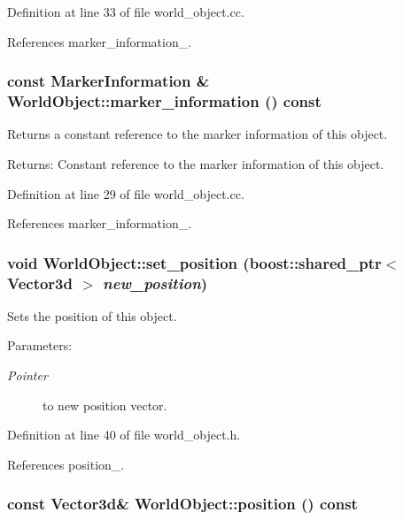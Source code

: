 Definition at line 33 of file world\_\-object.cc.

References marker\_\-information\_\-.\hypertarget{class_world_object_1dd7d80498c6b502ad9870c54cbf4305}{
\subsubsection[marker\_\-information]{\setlength{\rightskip}{0pt plus 5cm}const {\bf MarkerInformation} \& WorldObject::marker\_\-information () const}}
\label{class_world_object_1dd7d80498c6b502ad9870c54cbf4305}


Returns a constant reference to the marker information of this object. \begin{Desc}
\item[Returns:]Constant reference to the marker information of this object. \end{Desc}


Definition at line 29 of file world\_\-object.cc.

References marker\_\-information\_\-.\hypertarget{class_world_object_60afe09f64b069c79833bb9a07a71cc1}{
\subsubsection[set\_\-position]{\setlength{\rightskip}{0pt plus 5cm}void WorldObject::set\_\-position (boost::shared\_\-ptr$<$ Vector3d $>$ {\em new\_\-position})}}
\label{class_world_object_60afe09f64b069c79833bb9a07a71cc1}


Sets the position of this object. \begin{Desc}
\item[Parameters:]
\begin{description}
\item[{\em Pointer}]to new position vector. \end{description}
\end{Desc}


Definition at line 40 of file world\_\-object.h.

References position\_\-.\hypertarget{class_world_object_27b52dcd1b64d4dd45936da833e1ea26}{
\subsubsection[position]{\setlength{\rightskip}{0pt plus 5cm}const Vector3d\& WorldObject::position () const}}
\label{class_world_object_27b52dcd1b64d4dd45936da833e1ea26}


